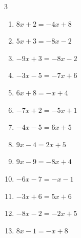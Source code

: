 \begin{multicols}{3}
\begin{enumerate}

\columnbreak %

\resetques

  \item $8x+2=-4x+8$


  \item $5x+3=-8x-2$


  \item $-9x+3=-8x-2$

        \phantom{$\displaystyle x=5$}

  \item $-3x-5=-7x+6$


  \item $6x+8=-x+4$


  \item $-7x+2=-5x+1$


  \item $-4x-5=6x+5$

        \phantom{$\displaystyle x=-1$}

  \item $9x-4=2x+5$


  \item $9x-9=-8x+4$


  \item $-6x-7=-x-1$


  \item $-3x+6=5x+6$

        \phantom{$\displaystyle x=0$}

  \item $-8x-2=-2x+5$


  \item $8x-1=-x+8$

        \phantom{$\displaystyle x=1$}


\end{enumerate}
\end{multicols}
